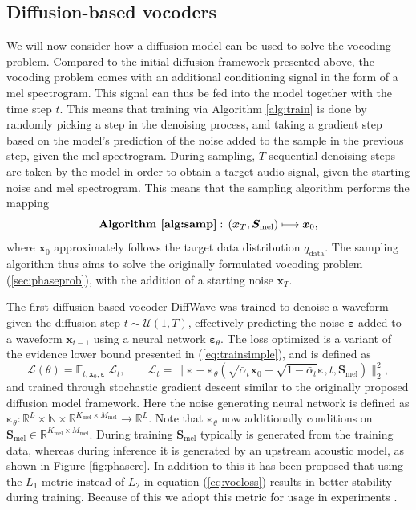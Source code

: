 \documentclass{report}
\begin{document}
\subsection{Diffusion-based vocoders}
\label{sec:diffvoc}

We will now consider how a diffusion model can be used to solve the vocoding problem. Compared to the initial diffusion framework presented above, the vocoding problem comes with an additional conditioning signal in the form of a mel spectrogram. This signal can thus be fed into the model together with the time step $t$. This means that training via Algorithm \ref{alg:train} is done by randomly picking a step in the denoising process, and taking a gradient step based on the model's prediction of the noise added to the sample in the previous step, given the mel spectrogram. During sampling, $T$ sequential denoising steps are taken by the model in order to obtain a target audio signal, given the starting noise and mel spectrogram. This means that the sampling algorithm performs the mapping
\begin{equation}
    \textbf{Algorithm \ref{alg:samp}}: \, (\bm{x}_T, \bm{S}_{\text{mel}}) \longmapsto \bm{x}_0,
\end{equation}
where $\bm{x}_0$ approximately follows the target data distribution $q_{\text{data}}$. The sampling algorithm thus aims to solve the originally formulated vocoding problem (\ref{sec:phaseprob}), with the addition of a starting noise $\bm{x}_T$.

The first diffusion-based vocoder DiffWave \cite{kong2020diffwave} was trained to denoise a waveform given the diffusion step $t \sim \mathcal{U}(1, T)$, effectively predicting the noise $\bm{\varepsilon}$ added to a waveform $\bm{x}_{t-1}$ using a neural network $\bm{\varepsilon}_{\theta}$. The loss optimized is a variant of the evidence lower bound presented in (\ref{eq:trainsimple}), and is defined as
\begin{equation} \label{eq:vocloss}
    \mathcal{L}(\theta) = \mathbb{E}_{t, \bm{x}_0, \bm{\varepsilon}} \ \mathcal{L}_{t}, \qquad \mathcal{L}_{t} = \| \bm{\varepsilon} - \bm{\varepsilon}_{\theta}(\sqrt{\bar{\alpha}_t} \bm{x}_0 + \sqrt{1 - \bar{\alpha}_t}\bm{\varepsilon}, t, \bm{S}_{\text{mel}}) \|_2^2,
\end{equation}
and trained through stochastic gradient descent similar to the originally proposed diffusion model framework. Here the noise generating neural network is defined as $\bm{\varepsilon}_{\theta}: \mathbb{R}^L \times \mathbb{N} \times \mathbb{R}^{K_{\text{mel}} \times M_{\text{mel}}} \rightarrow \mathbb{R}^L$. Note that $\bm{\varepsilon}_{\theta}$ now additionally conditions on $\bm{S}_{\text{mel}} \in \mathbb{R}^{K_{\text{mel}} \times M_{\text{mel}}}$. During training $\bm{S}_{\text{mel}}$ typically is generated from the training data, whereas during inference it is generated by an upstream acoustic model, as shown in Figure \ref{fig:phasere}. In addition to this it has been proposed that using the $L_1$ metric instead of $L_2$ in equation (\ref{eq:vocloss}) results in better stability during training. Because of this we adopt this metric for usage in experiments \cite{chen2020wavegrad}.
\end{document}
